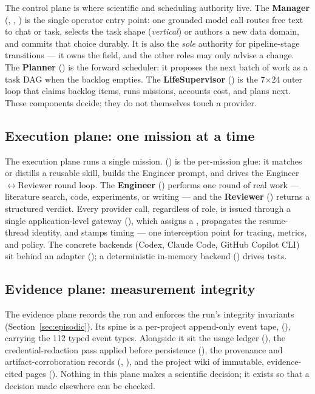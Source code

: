 The control plane is where scientific and scheduling authority live. The
\textbf{Manager} (, ,
) is the single operator entry point: one grounded
model call routes free text to chat or task, selects the task shape
(\emph{vertical}) or authors a new data domain, and commits that choice durably.
It is also the \emph{sole} authority for pipeline-stage transitions --- it owns
the  field, and the other roles may only advise a change.
The \textbf{Planner} () is the forward scheduler: it
proposes the next batch of work as a task DAG when the backlog empties. The
\textbf{LifeSupervisor} () is the 7$\times$24
outer loop that claims backlog items, runs missions, accounts cost, and plans
next. These components decide; they do not themselves touch a provider.

\subsection{Execution plane: one mission at a time}

The execution plane runs a single mission.  ()
is the per-mission glue: it matches or distills a reusable skill, builds the
Engineer prompt, and drives the Engineer$\leftrightarrow$Reviewer round loop. The
\textbf{Engineer} () performs one round of real work
--- literature search, code, experiments, or writing --- and the \textbf{Reviewer}
() returns a structured verdict. Every provider call,
regardless of role, is issued through a single application-level gateway
(), which assigns a , propagates the
resume-thread identity, and stamps timing --- one interception point for tracing,
metrics, and policy. The concrete backends (Codex, Claude Code, GitHub Copilot
CLI) sit behind an adapter (); a
deterministic in-memory backend () drives
tests.

\subsection{Evidence plane: measurement integrity}

The evidence plane records the run and enforces the run's integrity invariants
(Section~\ref{sec:episodic}). Its spine is a per-project append-only
event tape,  (), carrying the 112 typed
event types. Alongside it sit the usage ledger (), the
credential-redaction pass applied before persistence
(), the provenance and artifact-corroboration
records (, ), and the
project wiki of immutable, evidence-cited pages ().
Nothing in this plane makes a scientific decision; it exists so that a decision
made elsewhere can be checked.

